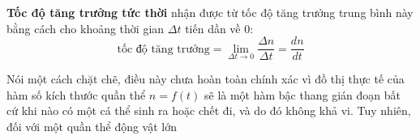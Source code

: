 \textbf{Tốc độ tăng trưởng tức thời} nhận được từ tốc độ tăng trưởng trung bình này bằng cách cho khoảng thời gian $\Delta t$ tiến dần về $0$:
\begin{equation*}
\text{tốc độ tăng trưởng} = \lim_{\Delta t \to 0} \frac{\Delta n}{\Delta t} = \frac{dn}{dt}
\end{equation*}

Nói một cách chặt chẽ, điều này chưa hoàn toàn chính xác vì đồ thị thực tế của hàm số kích thước quần thể $n = f(t)$ sẽ là một hàm bậc thang gián đoạn bất cứ khi nào có một cá thể sinh ra hoặc chết đi, và do đó không khả vi. Tuy nhiên, đối với một quần thể động vật lớn
